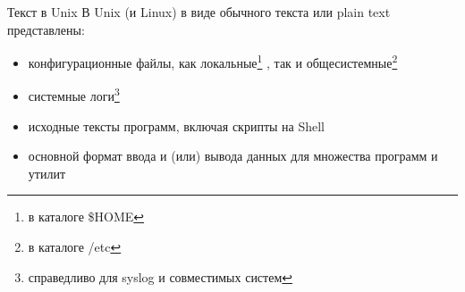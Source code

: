 \begin{frame}{Текст в Unix}
  В Unix (и Linux) в виде обычного текста или \alert{plain text} представлены:\pause
  \begin{itemize}
    \item \alert{конфигурационные файлы}, как локальные\footnote{в каталоге \$HOME} , так и общесистемные\footnote{в каталоге /etc} \pause
    \item \alert{системные логи}\footnote{справедливо для \alert{syslog} и совместимых систем}
    \item \alert{исходные тексты программ}, включая скрипты на Shell
    \item \alert{основной формат ввода и (или) вывода данных} для множества программ и утилит
  \end{itemize} 

\end{frame}


%
%
%

